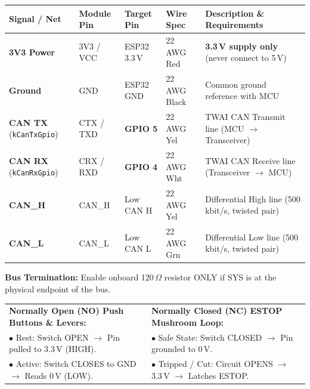 \documentclass[11pt,a4paper]{article}
\begin{document}
\begin{tcolorbox}[bwcard, title={2. Low CAN Bus Transceiver (SN65HVD230 / WCMCU-230)}]
\begin{tabularx}{\textwidth}{@{} L{3.2cm} C{2.2cm} C{2.2cm} L{2.5cm} Y @{}}
\toprule
\textbf{Signal / Net} & \textbf{Module Pin} & \textbf{Target Pin} & \textbf{Wire Spec} & \textbf{Description \& Requirements} \\
\midrule
\textbf{3V3 Power} & 3V3 / VCC & ESP32 3.3\,V & 22 AWG Red & \textbf{3.3\,V supply only} (never connect to 5\,V) \\
\textbf{Ground} & GND & ESP32 GND & 22 AWG Black & Common ground reference with MCU \\
\textbf{CAN TX} (\texttt{kCanTxGpio}) & CTX / TXD & \textbf{GPIO 5} & 22 AWG Yel & TWAI CAN Transmit line (MCU $\rightarrow$ Transceiver) \\
\textbf{CAN RX} (\texttt{kCanRxGpio}) & CRX / RXD & \textbf{GPIO 4} & 22 AWG Wht & TWAI CAN Receive line (Transceiver $\rightarrow$ MCU) \\
\textbf{CAN\_H} & CAN\_H & Low CAN H & 22 AWG Yel & Differential High line (500 kbit/s, twisted pair) \\
\textbf{CAN\_L} & CAN\_L & Low CAN L & 22 AWG Grn & Differential Low line (500 kbit/s, twisted pair) \\
\bottomrule
\end{tabularx}
\vspace{1pt}
\textbf{Bus Termination:} Enable onboard 120\,$\Omega$ resistor ONLY if SYS is at the physical endpoint of the bus.
\end{tcolorbox}

\vspace{-4pt}

\begin{tcolorbox}[bwcard, title={3. Switch Connection Logic \& Fail-Safe Summary}]
\begin{tabularx}{\textwidth}{@{} Y Y @{}}
  \textbf{Normally Open (NO) Push Buttons \& Levers:} & \textbf{Normally Closed (NC) ESTOP Mushroom Loop:} \\
  $\bullet$ Rest: Switch OPEN $\rightarrow$ Pin pulled to 3.3\,V (HIGH). & $\bullet$ Safe State: Switch CLOSED $\rightarrow$ Pin grounded to 0\,V. \\
  $\bullet$ Active: Switch CLOSES to GND $\rightarrow$ Reads 0\,V (LOW). & $\bullet$ Tripped / Cut: Circuit OPENS $\rightarrow$ 3.3\,V $\rightarrow$ Latches ESTOP. \\
\end{tabularx}
\end{tcolorbox}
\end{document}
